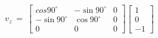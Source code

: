 \documentclass[preview]{standalone}
\begin{document}
\begin{align*}
v_z\ =\ \begin{bmatrix}
                        cos90^\circ & -\sin90^\circ & 0\\
                        -\sin90^\circ & \cos90^\circ & 0 \\
                        0 & 0 & 0
                        \end{bmatrix}\begin{bmatrix}
                        1\\
                        0\\
                        -1
                        \end{bmatrix}\\
\end{align*}
\end{document}
